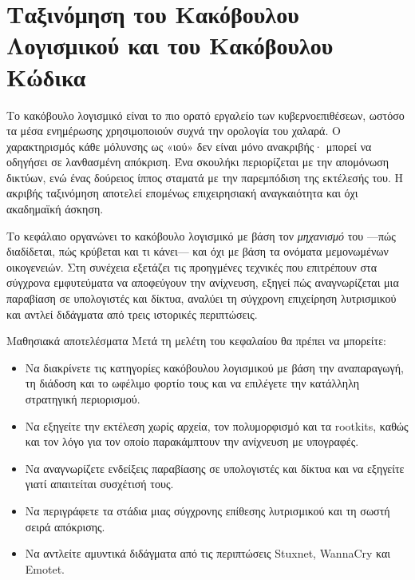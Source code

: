 \chapter{Ταξινόμηση του Κακόβουλου Λογισμικού και του Κακόβουλου Κώδικα}\label{ch:4}

Το κακόβουλο λογισμικό είναι το πιο ορατό εργαλείο των κυβερνοεπιθέσεων, ωστόσο τα μέσα ενημέρωσης χρησιμοποιούν συχνά την ορολογία του χαλαρά. Ο χαρακτηρισμός κάθε μόλυνσης ως «ιού» δεν είναι μόνο ανακριβής· μπορεί να οδηγήσει σε λανθασμένη απόκριση. Ένα σκουλήκι περιορίζεται με την απομόνωση δικτύων, ενώ ένας δούρειος ίππος σταματά με την παρεμπόδιση της εκτέλεσής του. Η ακριβής ταξινόμηση αποτελεί επομένως επιχειρησιακή αναγκαιότητα και όχι ακαδημαϊκή άσκηση.

Το κεφάλαιο οργανώνει το κακόβουλο λογισμικό με βάση τον \emph{μηχανισμό} του —πώς διαδίδεται, πώς κρύβεται και τι κάνει— και όχι με βάση τα ονόματα μεμονωμένων οικογενειών. Στη συνέχεια εξετάζει τις προηγμένες τεχνικές που επιτρέπουν στα σύγχρονα εμφυτεύματα να αποφεύγουν την ανίχνευση, εξηγεί πώς αναγνωρίζεται μια παραβίαση σε υπολογιστές και δίκτυα, αναλύει τη σύγχρονη επιχείρηση λυτρισμικού και αντλεί διδάγματα από τρεις ιστορικές περιπτώσεις.

\begin{outcomesbox}{Μαθησιακά αποτελέσματα}
Μετά τη μελέτη του κεφαλαίου θα πρέπει να μπορείτε:
\begin{itemize}
  \item Να διακρίνετε τις κατηγορίες κακόβουλου λογισμικού με βάση την αναπαραγωγή, τη διάδοση και το ωφέλιμο φορτίο τους και να επιλέγετε την κατάλληλη στρατηγική περιορισμού.
  \item Να εξηγείτε την εκτέλεση χωρίς αρχεία, τον πολυμορφισμό και τα rootkits, καθώς και τον λόγο για τον οποίο παρακάμπτουν την ανίχνευση με υπογραφές.
  \item Να αναγνωρίζετε ενδείξεις παραβίασης σε υπολογιστές και δίκτυα και να εξηγείτε γιατί απαιτείται συσχέτισή τους.
  \item Να περιγράφετε τα στάδια μιας σύγχρονης επίθεσης λυτρισμικού και τη σωστή σειρά απόκρισης.
  \item Να αντλείτε αμυντικά διδάγματα από τις περιπτώσεις Stuxnet, WannaCry και Emotet.
\end{itemize}
\end{outcomesbox}


